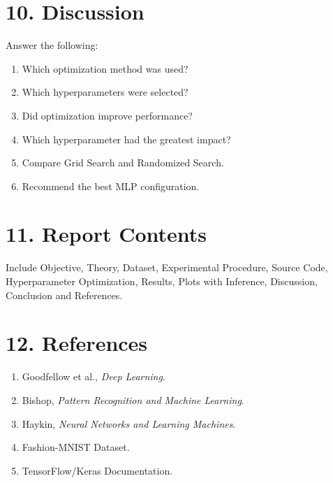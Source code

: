 \documentclass[11pt]{article}
\begin{document}
\section*{10. Discussion}

Answer the following:

\begin{enumerate}
\item Which optimization method was used?
\item Which hyperparameters were selected?
\item Did optimization improve performance?
\item Which hyperparameter had the greatest impact?
\item Compare Grid Search and Randomized Search.
\item Recommend the best MLP configuration.
\end{enumerate}

\section*{11. Report Contents}

Include Objective, Theory, Dataset, Experimental Procedure, Source Code, Hyperparameter Optimization, Results, Plots with Inference, Discussion, Conclusion and References.

\section*{12. References}
\begin{enumerate}
\item Goodfellow et al., \emph{Deep Learning}.
\item Bishop, \emph{Pattern Recognition and Machine Learning}.
\item Haykin, \emph{Neural Networks and Learning Machines}.
\item Fashion-MNIST Dataset.
\item TensorFlow/Keras Documentation.
\end{enumerate}
\end{document}
